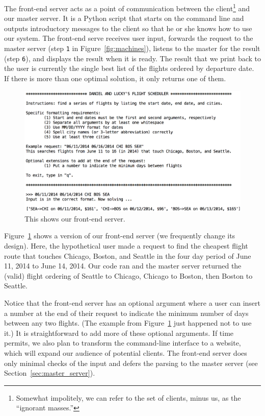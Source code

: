 \documentclass{article}
\begin{document}
The front-end server acts as a point of communication between the client\footnote{Somewhat impolitely, we can refer to the set of clients, minus us,
as the ``ignorant masses.''} and our master server. It is a Python script that starts on the command line and outputs introductory messages to the
client so that he or she knows how to use our system. The front-end serve receives user input, forwards the request to the master server (step
\texttt{1} in Figure~\ref{fig:machines}), listens to the master for the result (step \texttt{6}), and displays the result when it is ready. The result
that we print back to the user is currently the single best list of the flights ordered by departure date. If there is more than one optimal solution,
it only returns one of them.

\begin{figure}[t]
\vskip 0.2in
\begin{center}
\centerline{\includegraphics[width=\columnwidth]{front_end_server2}}
\caption{This shows our front-end server.}
\label{fig:front_end_server}
\end{center}
\vskip -0.2in
\end{figure}

Figure~\ref{fig:front_end_server} shows a version of our front-end server (we frequently change its design). Here, the hypothetical user made a
request to find the cheapest flight route that touches Chicago, Boston, and Seattle in the four day period of June 11, 2014 to June 14, 2014.
Our code ran and the master server returned the (valid) flight ordering of Seattle to Chicago, Chicago to Boston, then Boston to Seattle.

Notice that the front-end server has an optional argument where a user can insert a number at the end of their request to indicate the minimum number
of days between any two flights. (The example from Figure~\ref{fig:front_end_server} just happened not to use it.) It is straightforward to add
more of these optional arguments. If time permits, we also plan to transform the command-line interface to a website, which will expand our audience
of potential clients. The front-end server does only minimal checks of the input and defers the parsing to the master server (see
Section~\ref{sec:master_server}).
\end{document}
